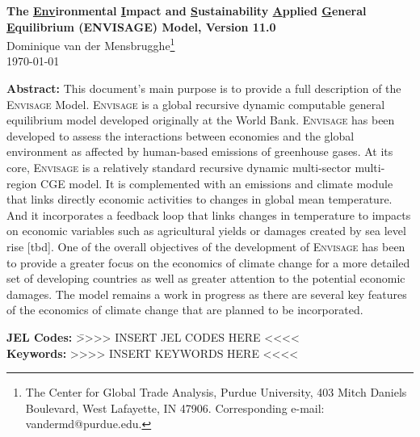 \documentclass[11pt,letterpaper]{report}
\begin{document}
\pagestyle{empty}

\vspace*{1cm}

\begin{center}

\Large \textbf{{The \underline{Env}ironmental \underline{I}mpact and
   \underline{S}ustainability \underline{A}pplied \underline{G}eneral
   \underline{E}quilibrium ({ENVISAGE}) Model, Version 11.0}} \\[2cm]

\large{Dominique van der Mensbrugghe\footnote{The Center for Global Trade Analysis,
   Purdue University, 403 Mitch Daniels Boulevard, West Lafayette, IN 47906.
   Corresponding e-mail: vandermd@purdue.edu.}
} \\ [1cm]

\today \\ [2cm]

\normalsize
\begin{minipage}{0.85\linewidth}
\textbf{Abstract: }
{This document's main purpose is to provide a full description
of the \textsc{Envisage} Model. \textsc{Envisage} is a global recursive dynamic
computable general equilibrium model developed originally at the {World Bank}.
\textsc{Envisage} has been developed to
assess the interactions between economies and the global environment as affected
by human-based emissions of greenhouse gases. At its core, \textsc{Envisage} is
a relatively standard recursive dynamic multi-sector multi-region CGE model. It
is complemented with an emissions and climate module that links
directly economic activities to changes in global mean temperature. And it
incorporates a feedback loop that links changes in temperature to impacts on
economic variables such as agricultural yields or damages created by sea level
rise [tbd]. One of the overall objectives of the development of
\textsc{Envisage} has been to provide a greater focus on the economics of
climate change for a more detailed set of developing countries as well as
greater attention to the potential economic damages. The model remains a work in
progress as there are several key features of the economics of climate change
that are planned to be incorporated.}
\end{minipage}
\end{center}

\vspace{2cm}
\begin{tabbing}
\hspace*{0.5cm} \textbf{JEL Codes:} \= {>>>> INSERT JEL CODES HERE <<<<} \\
\hspace*{0.5cm} \textbf{Keywords:}  \> {>>>> INSERT KEYWORDS HERE <<<<}\\
\end{tabbing}
\newpage
\end{document}
